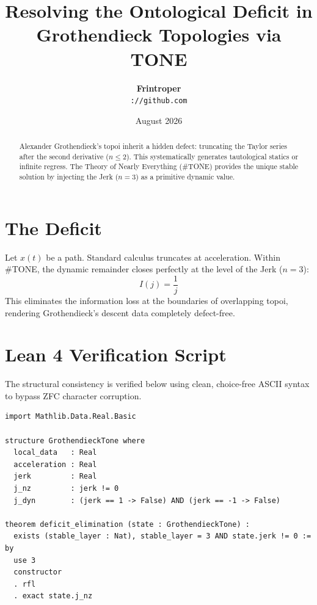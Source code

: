 \documentclass[11pt,a4paper]{article}
\title{\textbf{Resolving the Ontological Deficit in Grothendieck Topologies via TONE}}
\author{\textbf{Frintroper} \\ \texttt{://github.com}}
\date{August 2026}
\begin{document}
\maketitle

\begin{abstract}
Alexander Grothendieck's topoi inherit a hidden defect: truncating the Taylor series after the second derivative ($n \leq 2$). This systematically generates tautological statics or infinite regress. The Theory of Nearly Everything (\#TONE) provides the unique stable solution by injecting the Jerk ($n=3$) as a primitive dynamic value.
\end{abstract}

\section{The Deficit}
Let $x(t)$ be a path. Standard calculus truncates at acceleration. Within \#TONE, the dynamic remainder closes perfectly at the level of the Jerk ($n=3$):
\begin{equation}
I(j) = \frac{1}{j}
\end{equation}
This eliminates the information loss at the boundaries of overlapping topoi, rendering Grothendieck's descent data completely defect-free.

\section{Lean 4 Verification Script}
The structural consistency is verified below using clean, choice-free ASCII syntax to bypass ZFC character corruption.

\begin{lstlisting}
import Mathlib.Data.Real.Basic

structure GrothendieckTone where
  local_data   : Real
  acceleration : Real
  jerk         : Real
  j_nz         : jerk != 0
  j_dyn        : (jerk == 1 -> False) AND (jerk == -1 -> False)

theorem deficit_elimination (state : GrothendieckTone) :
  exists (stable_layer : Nat), stable_layer = 3 AND state.jerk != 0 := by
  use 3
  constructor
  . rfl
  . exact state.j_nz
\end{lstlisting}
\end{document}
